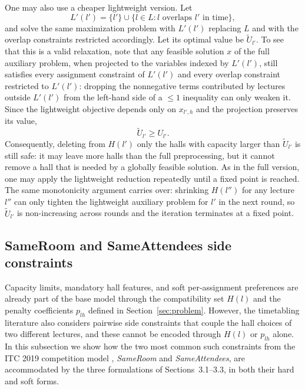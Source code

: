 \documentclass[11pt]{article}
\begin{document}
One may also use a cheaper lightweight version. Let
\[
L'(l') = \{l'\} \cup \{l \in L : \text{$l$ overlaps $l'$ in time}\},
\]
and solve the same maximization problem with $L'(l')$ replacing $L$ and with the overlap constraints restricted accordingly. Let its optimal value be $\widetilde U_{l'}$. To see that this is a valid relaxation, note that any feasible solution $x$ of the full auxiliary problem, when projected to the variables indexed by $L'(l')$, still satisfies every assignment constraint of $L'(l')$ and every overlap constraint restricted to $L'(l')$: dropping the nonnegative terms contributed by lectures outside $L'(l')$ from the left-hand side of a $\le 1$ inequality can only weaken it. Since the lightweight objective depends only on $x_{l',h}$ and the projection preserves its value,
\[
\widetilde U_{l'} \ge U_{l'}.
\]
Consequently, deleting from $H(l')$ only the halls with capacity larger than $\widetilde U_{l'}$ is still safe: it may leave more halls than the full preprocessing, but it cannot remove a hall that is needed by a globally feasible solution. As in the full version, one may apply the lightweight reduction repeatedly until a fixed point is reached. The same monotonicity argument carries over: shrinking $H(l'')$ for any lecture $l''$ can only tighten the lightweight auxiliary problem for $l'$ in the next round, so $\widetilde U_{l'}$ is non-increasing across rounds and the iteration terminates at a fixed point.

\subsection{SameRoom and SameAttendees side constraints}
Capacity limits, mandatory hall features, and soft per-assignment preferences are already part of the base model through the compatibility set $H(l)$ and the penalty coefficients $p_{lh}$ defined in Section~\ref{sec:problem}. However, the timetabling literature also considers pairwise side constraints that couple the hall choices of two different lectures, and these cannot be encoded through $H(l)$ or $p_{lh}$ alone. In this subsection we show how the two most common such constraints from the ITC 2019 competition model \citep{muller2025itc2019}, \emph{SameRoom} and \emph{SameAttendees}, are accommodated by the three formulations of Sections~3.1--3.3, in both their hard and soft forms.
\end{document}
